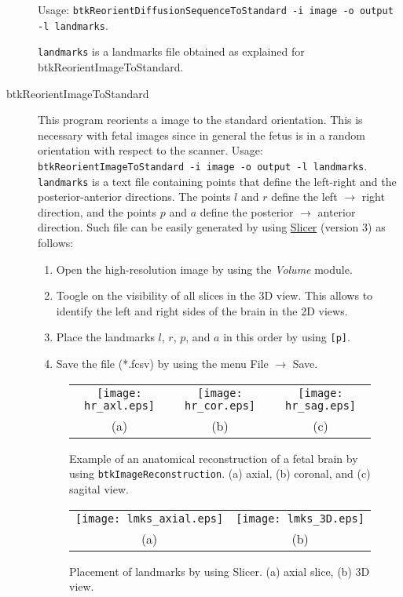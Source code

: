 \begin{description}
Usage: \texttt{btkReorientDiffusionSequenceToStandard -i image -o output -l
landmarks}.

\texttt{landmarks} is a landmarks file obtained as explained for btkReorientImageToStandard.

\item[btkReorientImageToStandard] This program reorients a image to the standard orientation. This is necessary with fetal images since in general the fetus is in a random orientation with respect to the scanner.
Usage: \texttt{btkReorientImageToStandard -i image -o output -l landmarks}.
\texttt{landmarks} is a text file containing points that define the left-right
and the posterior-anterior directions. The points $l$ and $r$ define the left
$\rightarrow$ right direction, and the points $p$ and $a$ define the posterior
$\rightarrow$ anterior direction. Such file can be easily generated by using
\href{http://www.slicer.org}{Slicer} (version 3) as follows:

\begin{enumerate}
\item Open the high-resolution image by using the \textit{Volume} module.
\item Toogle on the visibility of all slices in the 3D view. This allows to
identify the left and right sides of the brain in the 2D views.
\item Place the landmarks $l$, $r$, $p$, and $a$ in this order by using
\texttt{[p]}.
\item Save the file (*.fcsv) by using the menu File $\rightarrow$ Save.
\end{enumerate}


\begin{figure}[t]
\centering
\begin{tabular}{ccc}
\texttt{[image: hr\_axl.eps]}&
\texttt{[image: hr\_cor.eps]}&
\texttt{[image: hr\_sag.eps]}\\
{(a)}&{(b)}&{(c)}\\
\end{tabular}
\caption{Example of an anatomical reconstruction of a fetal brain by using
\texttt{btkImageReconstruction}. (a) axial, (b) coronal, and (c) sagital view.}
\label{fig:reconstruction}
\end{figure}

\begin{figure}[t]
\centering
\begin{tabular}{cc}
\texttt{[image: lmks\_axial.eps]}&
\texttt{[image: lmks\_3D.eps]}\\
{(a)}&{(b)}\\
\end{tabular}
\caption{Placement of landmarks by using Slicer. (a) axial slice, (b) 3D view.}
\label{fig:landmarks}
\end{figure}


\end{description}
